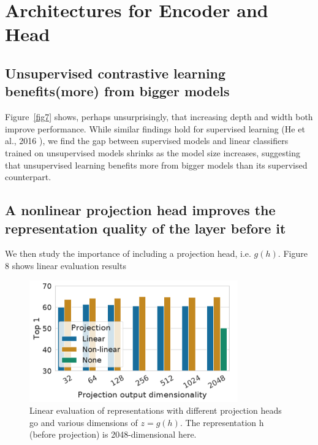 \documentclass[]{IEEEtran}
\begin{document}
\section{Architectures for Encoder and Head}
 
\subsection{Unsupervised contrastive learning beneﬁts(more) from bigger models }

Figure~\ref{fig7} shows, perhaps unsurprisingly, that increasing depth and width both improve performance. While similar findings hold for supervised learning (He et al., 2016 ), we find the gap between supervised models and linear classifiers trained on unsupervised models shrinks as the model size increases, suggesting that unsupervised learning benefits more from bigger models than its supervised counterpart.

\subsection{A nonlinear projection head improves the representation quality of the layer before it }

We then study the importance of including a projection head, i.e. $g(h) .$ Figure 8 shows linear evaluation results

\begin{figure}[!h]
\centering
\includegraphics[width=9cm]{images/fig8.PNG}
\caption{Linear evaluation of representations with different projection heads go and various dimensions of $z = g(h)$. The representation h (before projection) is 2048-dimensional here.}
\label{fig8}
\end{figure}
\end{document}
